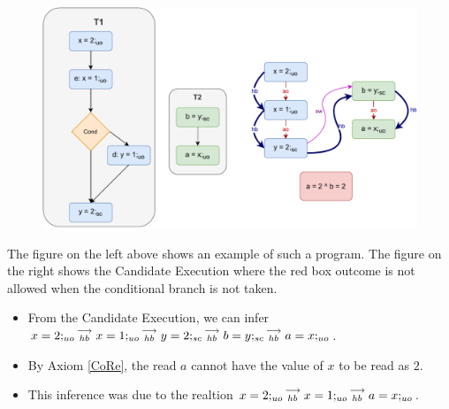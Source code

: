 
            \begin{figure}[H]
                \centering 
                \includegraphics[scale=0.7]{5.InstructionReordering/5.ValidReorderingProgram/CounterExamples2a(Conditionals).pdf}
                \caption{}
            \end{figure}
            The figure on the left above shows an example of such a program.  
            The figure on the right shows the Candidate Execution where the red box outcome is not allowed when the conditional branch is not taken.
            \begin{itemize}
                \item From the Candidate Execution, we can infer $x=2;_{uo}\stackrel{\longrightarrow}{_{hb}}x=1;_{uo}\stackrel{\longrightarrow}{_{hb}}y=2;_{sc}\stackrel{\longrightarrow}{_{hb}}b=y;_{sc}\stackrel{\longrightarrow}{_{hb}}a=x;_{uo}$.
                \item By Axiom \ref{CoRe}, the read $a$ cannot have the value of $x$ to be read as $2$.  
                \item This inference was due to the realtion $x=2;_{uo}\stackrel{\longrightarrow}{_{hb}}x=1;_{uo}\stackrel{\longrightarrow}{_{hb}}a=x;_{uo}$.
            \end{itemize}

